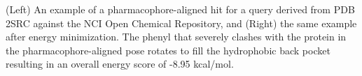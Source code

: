 \label{minfig} (Left) An example of a pharmacophore-aligned hit for a query derived from PDB 2SRC against the NCI Open Chemical Repository, and (Right) the same example after energy minimization. The phenyl that severely clashes with the protein in the pharmacophore-aligned pose rotates to fill the hydrophobic back pocket resulting in an overall energy score of -8.95 kcal/mol.